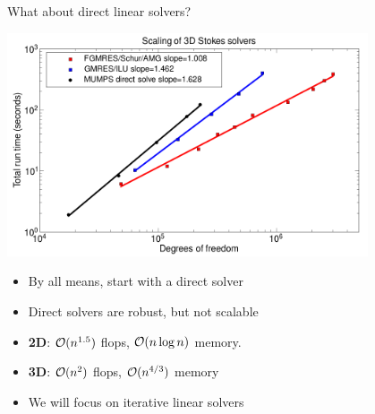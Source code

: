\documentclass{beamer}
\begin{document}
\begin{frame}{What about direct linear solvers?}
  \begin{centering}
    \includegraphics[width=0.8\textwidth]{figures/MG/StokesScalingDirectVsChebySchur}
  \end{centering}
  \begin{itemize}
  \item By all means, start with a direct solver
  \item Direct solvers are \alert{robust}, but \alert{not scalable}
  \item {\bf 2D}: $\mathcal{O}(n^{1.5})$ flops, $\mathcal{O}(n\log n)$ memory.
  \item {\bf 3D}: $\mathcal{O}(n^2)$ flops, $\mathcal{O}(n^{4/3})$ memory
  \item We will focus on \alert{iterative} linear solvers
  \end{itemize}
\end{frame}



\end{document}
